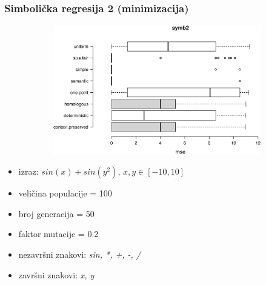 \documentclass{beamer}
\begin{document}
\begin{frame}
\frametitle{Simbolička regresija 2 (minimizacija)}


\begin{figure}[!htb]
\begin{figure}[H]
	\centering
	\includegraphics[trim=3.5cm 5.5cm 0cm 3.5cm, scale=0.3]{./boxPlots/symb2.eps}
\end{figure}

\endminipage
{}
\endminipage
\end{figure}

\begin{itemize}
\item{izraz: $sin(x) + sin(y^2)$, $x, y \in [-10, 10]$}
\item{veličina populacije = 100}
\item{broj generacija = 50}
\item{faktor mutacije = 0.2}
\item{nezavršni znakovi: \textit{sin, *, +, -, /}}
\item{završni znakovi: \textit{x, y}}
\end{itemize}
\end{frame}
\end{document}
